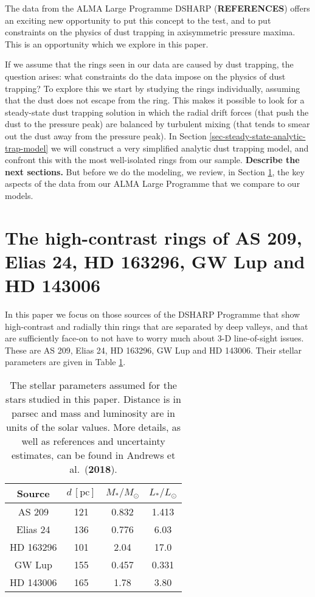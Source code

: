 \documentclass{aa}
\def\paperdsharpandrews{Andrews et al.\ ({\bf 2018})}
\begin{document}
The data from the ALMA Large Programme DSHARP ({\bf REFERENCES}) offers an exciting new
opportunity to put this concept to the test, and to put constraints on the
physics of dust trapping in axisymmetric pressure maxima. This is an opportunity
which we explore in this paper.

If we assume that the rings seen in our data are caused by dust trapping, the
question arises: what constraints do the data impose on the physics of dust
trapping? To explore this we start by studying the rings individually, assuming
that the dust does not escape from the ring. This makes it possible to look for
a steady-state dust trapping solution in which the radial drift forces (that push
the dust to the pressure peak) are balanced by turbulent mixing (that tends to
smear out the dust away from the pressure peak). In Section
\ref{sec-steady-state-analytic-trap-model} we will construct a very simplified
analytic dust trapping model, and confront this with the most well-isolated
rings from our sample. {\bf Describe the next sections.} But before we do the
modeling, we review, in Section \ref{sec-data}, the key aspects of the data from
our ALMA Large Programme that we compare to our models.



\section{The high-contrast rings of AS 209, Elias 24, HD 163296, GW Lup and HD 143006}
\label{sec-data}
%
In this paper we focus on those sources of the DSHARP Programme
that show high-contrast and radially thin rings that are separated by deep
valleys, and that are sufficiently face-on to not have to worry much about 3-D
line-of-sight issues. These are AS 209, Elias 24, HD 163296, GW Lup and
HD 143006. Their stellar parameters are given in Table \ref{tab-stellar-params}.

\begin{table}
\begin{center}
\begin{tabular}{|c|ccc|}
\hline
\hline
Source     & $d\,\mathrm{[pc]}$ & $M_{*}/M_{\odot}$ & $L_{*}/L_{\odot}$ \\
\hline
AS 209     & 121              & 0.832        &  1.413 \\ %
Elias 24   & 136              & 0.776        &  6.03  \\ %
HD 163296  & 101              & 2.04         &  17.0  \\ %
GW Lup     & 155              & 0.457        &  0.331 \\ %
HD 143006  & 165              & 1.78         &  3.80 \\  %
\hline
\hline
\end{tabular}
\end{center}
\caption{\label{tab-stellar-params}The stellar parameters assumed for the stars
  studied in this paper. Distance is in parsec and mass and luminosity are in
  units of the solar values. More details, as well as references and uncertainty
  estimates, can be found in \paperdsharpandrews{}.}
\end{table}
\end{document}
